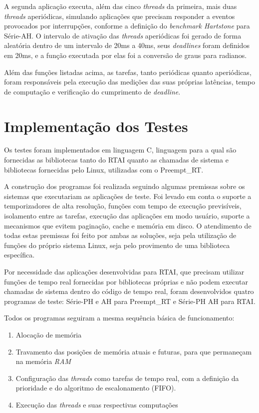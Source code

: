 A segunda aplicação executa, além das cinco \textit{threads} da primeira,  mais duas \textit{threads} aperiódicas, simulando aplicações que precisam responder a eventos provocados por interrupções, conforme a definição do \textit{benchmark Hartstone} para Série-AH. O intervalo de ativação das \textit{threads} aperiódicas foi gerado de forma aleatória dentro de um intervalo de 20ms a 40ms, seus \textit{deadlines} foram definidos em 20ms, e a função executada por elas foi a conversão de graus para radianos.

Além das funções listadas acima, as tarefas, tanto periódicas quanto aperiódicas, foram responsáveis pela execução das medições das suas próprias latências, tempo de computação e verificação do cumprimento de \textit{deadline}.

\section{Implementação dos Testes}
Os testes foram implementados em linguagem C, linguagem para a qual são fornecidas as bibliotecas tanto do RTAI quanto as chamadas de sistema e bibliotecas fornecidas pelo Linux, utilizadas com o Preempt\_RT.

A construção dos programas foi realizada seguindo algumas premissas sobre os sistemas que executariam as aplicações de teste. Foi levado em conta o suporte a temporizadores de alta resolução, funções com tempo de execução previsíveis, isolamento entre as tarefas, execução das aplicações em modo usuário, suporte a mecanismos que evitem paginação, cache e memória em disco. O atendimento de todas estas premissas foi feito por ambas as soluções, seja pela utilização de funções do próprio sistema Linux, seja pelo provimento de uma biblioteca específica.

Por necessidade das aplicações desenvolvidas para RTAI, que precisam utilizar funções de tempo real fornecidas por bibliotecas próprias e não podem executar chamadas de sistema dentro do código de tempo real, foram desenvolvidos quatro programas de teste: Série-PH e AH para Preempt\_RT e Série-PH AH para RTAI.

Todos os programas seguiram a mesma sequência básica de funcionamento:

\begin{enumerate}
   \item Alocação de memória
   \item Travamento das posições de memória atuais e futuras, para que permaneçam na memória \textit{RAM}
   \item Configuração das \textit{threads} como tarefas de tempo real, com a definição da prioridade e do algoritmo de escalonamento (FIFO).
   \item Execução das \textit{threads} e suas respectivas computações
\end{enumerate}

